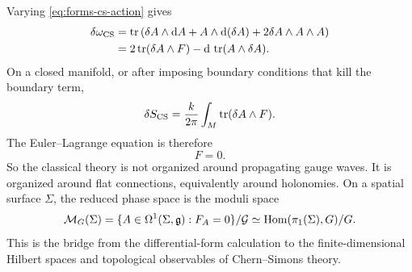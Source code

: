Varying \eqref{eq:forms-cs-action} gives
\begin{align}
  \delta\omega_{\operatorname{CS}}
  &=
  \operatorname{tr}\left(\delta A\wedge\mathrm{d} A+A\wedge\mathrm{d}(\delta A)
  +2\delta A\wedge A\wedge A\right)
  \notag\\
  &=
  2\operatorname{tr}(\delta A\wedge F)
  -
  \mathrm{d}\,\operatorname{tr}(A\wedge\delta A).
  \label{eq:forms-cs-variation}
\end{align}
On a closed manifold, or after imposing boundary conditions that kill the boundary term,
\begin{equation}
  \delta S_{\operatorname{CS}}
  =
  \frac{k}{2\pi}\int_M\operatorname{tr}(\delta A\wedge F).
  \label{eq:forms-action-variation}
\end{equation}
The Euler--Lagrange equation is therefore
\begin{equation}
  F=0.
  \label{eq:forms-flat-eom}
\end{equation}
So the classical theory is not organized around propagating gauge waves. It is organized around flat connections, equivalently around holonomies. On a spatial surface $\Sigma$, the reduced phase space is the moduli space
\begin{equation}
  \mathcal M_G(\Sigma)
  =
  \{A\in\Omega^1(\Sigma,\mathfrak g):F_A=0\}/\mathcal G
  \simeq
  \operatorname{Hom}(\pi_1(\Sigma),G)/G.
  \label{eq:forms-flat-moduli}
\end{equation}
This is the bridge from the differential-form calculation to the finite-dimensional Hilbert spaces and topological observables of Chern--Simons theory.
